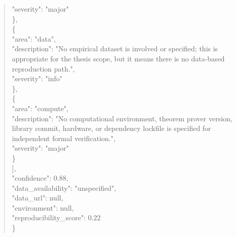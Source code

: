 \documentclass[11pt]{article}
\begin{document}
\begin{quote}
      "severity": "major"\\
    \},\\
    \{\\
      "area": "data",\\
      "description": "No empirical dataset is involved or specified; this is appropriate for the thesis scope, but it means there is no data-based reproduction path.",\\
      "severity": "info"\\
    \},\\
    \{\\
      "area": "compute",\\
      "description": "No computational environment, theorem prover version, library commit, hardware, or dependency lockfile is specified for independent formal verification.",\\
      "severity": "major"\\
    \}\\
  ],\\
  "confidence": 0.88,\\
  "data\_availability": "unspecified",\\
  "data\_url": null,\\
  "environment": null,\\
  "reproducibility\_score": 0.22\\
\}\\
\end{quote}
\end{document}
